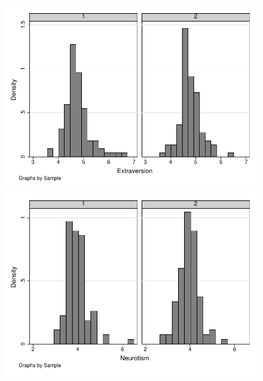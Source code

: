 \documentclass[12pt]{article}%
\begin{document}
\begin{figure}[htpb]
	\centering
	\includegraphics[]{extraversion.pdf}
	\includegraphics[]{neurotism.pdf}
\end{figure}
\end{document}
